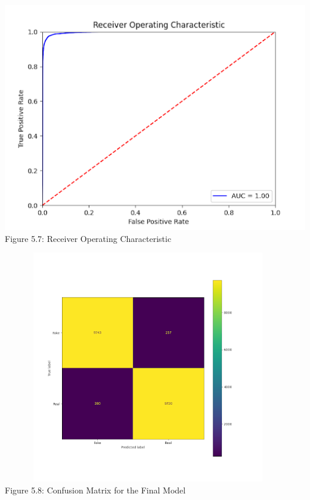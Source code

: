 \begin{center}
   \includegraphics[width=5.5in]{images/5.7.png} 
   \\\fontsize{11pt}{24pt}	Figure 5.7: Receiver Operating Characteristic
\end{center}

\begin{center}
   \includegraphics[width=5in,height=4in]{images/5.8.png} 
   \\\fontsize{11pt}{24pt}	Figure 5.8: Confusion Matrix for the Final Model
\end{center}
			

